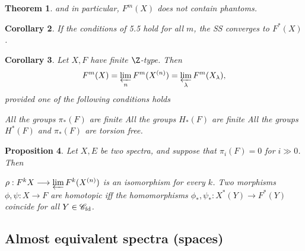 \documentclass[11pt]{article}
\theoremstyle{plain}
\newtheorem{thm}{Theorem}[subsection]
\newtheorem{prop}[thm]{Proposition}
\newtheorem{cor}[thm]{Corollary}
\theoremstyle{definition}
\newcommand{\Specfd}{\scrC_\textup{fd}}
\begin{document}
{\begin{thm}
and in particular, $F^m(X)$ does not contain phantoms.
\end{thm}
\begin{cor}
If the conditions of 5.5 hold for all $m$, the SS converges to $F^*(X)$.
\end{cor}
\begin{cor}
Let $X,F$ have finite $\Z$-type. Then
\[F^m(X)=\varprojlim_n F^m(X^{(n)})=\varprojlim_\lambda F^m(X_\lambda),\]
provided one of the following conditions holds\upcol
\begin{itemise}
\itm[(i)] All the groups $\pi_*(F)$ are finite\upsemi
\itm[(ii)] All the groups $H_*(F)$ are finite\upsemi
\itm[(iii)] All the groups $H^*(F)$ and $\pi_*(F)$ are torsion free.
\end{itemise}
\end{cor}
\begin{prop}Let $X,E$ be two spectra, and suppose that $\pi_i(F)=0$ for $i\gg0$. Then
\begin{itemise}
\itm[(i)] $\rho:F^kX\to\varprojlim F^k(X^{(n)})$ is an isomorphism for every $k$.
\itm[(ii)] Two morphisms $\phi,\psi:X\to F$ are homotopic iff the homomorphisms $\phi_*,\psi_*:X^*(Y)\to F^*(Y)$ coincide for all $Y\in\Specfd$.
\end{itemise}
\end{prop}
}   %
\subsection{Almost equivalent spectra (spaces)}
\end{document}
